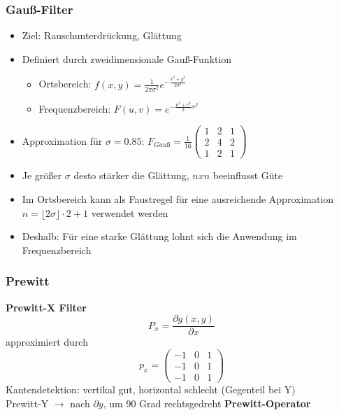 \subsubsection{Gauß-Filter}
\begin{itemize}
  \item Ziel: Rauschunterdrückung, Glättung
  \item Definiert durch zweidimensionale Gauß-Funktion
	
	\begin{itemize}
		\item Ortsbereich: $f(x,y) = \frac{1}{2 \pi \sigma^2} e^{-\frac{x^2 + y^2}{2\sigma^2}}$
		\item Frequenzbereich: $F(u,v)=e^{-\frac{u^2 + v^2}{2}\sigma^2}$
	\end{itemize}
	
	\item Approximation für $\sigma=0.85$: $F_{Gauß}=\frac{1}{16} \left(
	\begin{array}{ccc}
	1 & 2 & 1 \\
	2 & 4 & 2 \\
	1 & 2 & 1
	\end{array} \right)
	$
	
	\item Je größer $\sigma$ desto stärker die Glättung, $n x n $ beeinflusst Güte
	\item Im Ortsbereich kann als Faustregel für eine ausreichende Approximation $n=\lfloor 2\sigma \rfloor \cdot 2 +1 $ verwendet werden
	\item Deshalb: Für eine starke Glättung lohnt sich die Anwendung im Frequenzbereich
\end{itemize}



\subsubsection{Prewitt}

\textbf{Prewitt-X Filter} $$P_x = \frac{\partial g(x,y)}{\partial x}$$ approximiert durch $$p_x = \left( \begin{array}{ccc} -1 & 0 & 1 \\ -1 & 0 & 1 \\ -1 & 0 & 1 \end{array} \right)$$
Kantendetektion: vertikal gut, horizontal schlecht (Gegenteil bei Y)\\
Prewitt-Y $\to$ nach $\partial y$, um 90 Grad rechtsgedreht
\textbf{Prewitt-Operator}

